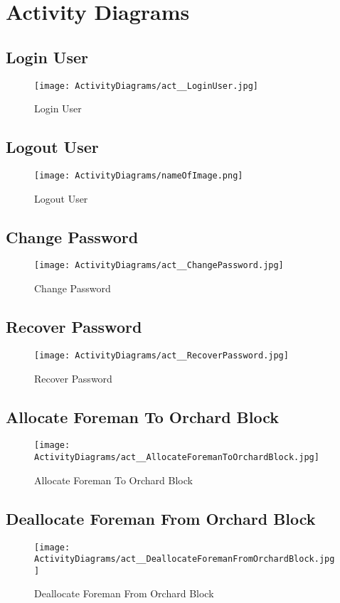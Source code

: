 \documentclass[11pt,fleqn]{book} %
\begin{document}
\section{Activity Diagrams}
\subsection{Login User}
\begin{figure}
	\texttt{[image: ActivityDiagrams/act\_\_LoginUser.jpg]}
	\caption{Login User}
\end{figure}

\subsection{Logout User}
\begin{figure}
	\texttt{[image: ActivityDiagrams/nameOfImage.png]}
	\caption{Logout User}
\end{figure}

\subsection{Change Password}
\begin{figure}
	\texttt{[image: ActivityDiagrams/act\_\_ChangePassword.jpg]}
	\caption{Change Password}
\end{figure}

\subsection{Recover Password}
\begin{figure}
	\texttt{[image: ActivityDiagrams/act\_\_RecoverPassword.jpg]}
	\caption{Recover Password}
\end{figure}

\subsection{Allocate Foreman To Orchard Block}
\begin{figure}
	\texttt{[image: ActivityDiagrams/act\_\_AllocateForemanToOrchardBlock.jpg]}
	\caption{Allocate Foreman To Orchard Block}
\end{figure}

\subsection{Deallocate Foreman From Orchard Block}
\begin{figure}
	\texttt{[image: ActivityDiagrams/act\_\_DeallocateForemanFromOrchardBlock.jpg]}
	\caption{Deallocate Foreman From Orchard Block}
\end{figure}
\end{document}
